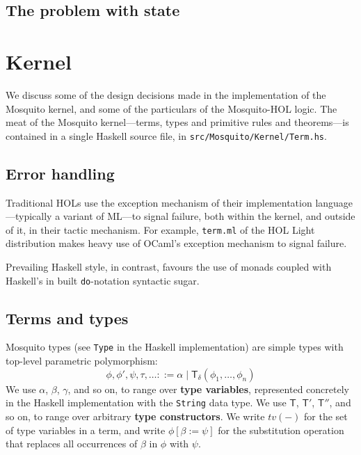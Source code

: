 \documentclass{llncs}
\newcommand{\deffont}[1]{\textbf{#1}}
\newcommand{\tf}[1]{\mathsf{#1}}
\begin{document}
\subsection{The problem with state}
\label{subsect.problem.with.state}

\section{Kernel}
\label{sect.kernel}

We discuss some of the design decisions made in the implementation of the Mosquito kernel, and some of the particulars of the Mosquito-HOL logic.
The meat of the Mosquito kernel---terms, types and primitive rules and theorems---is contained in a single Haskell source file, in \texttt{src/Mosquito/Kernel/Term.hs}.

\subsection{Error handling}
\label{subsect.error.handling}

Traditional HOLs use the exception mechanism of their implementation language---typically a variant of ML---to signal failure, both within the kernel, and outside of it, in their tactic mechanism.
For example, \texttt{term.ml} of the HOL Light distribution makes heavy use of OCaml's exception mechanism to signal failure.

Prevailing Haskell style, in contrast, favours the use of monads coupled with Haskell's in built \texttt{do}-notation syntactic sugar.

\subsection{Terms and types}
\label{subsect.terms.and.types}

Mosquito types (see \texttt{Type} in the Haskell implementation) are simple types with top-level parametric polymorphism:
\begin{displaymath}
\phi, \phi', \psi, \tau, \ldots ::= \alpha \mid \tf{T}_\delta(\phi_1, \ldots, \phi_n)
\end{displaymath}
We use $\alpha$, $\beta$, $\gamma$, and so on, to range over \deffont{type variables}, represented concretely in the Haskell implementation with the \texttt{String} data type.
We use $\tf{T}$, $\tf{T}'$, $\tf{T}''$, and so on, to range over arbitrary \deffont{type constructors}.
We write $tv(-)$ for the set of type variables in a term, and write $\phi[\beta := \psi]$ for the substitution operation that replaces all occurrences of $\beta$ in $\phi$ with $\psi$.
\end{document}
